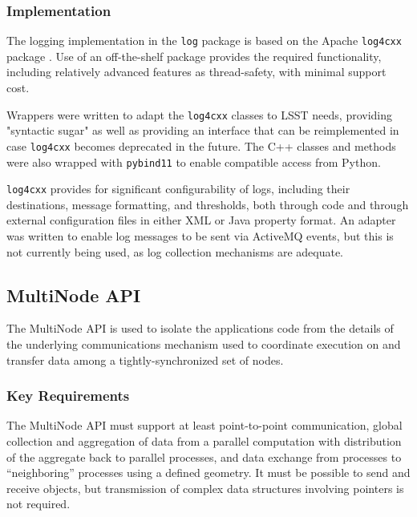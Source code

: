 \documentclass[DM,toc]{lsstdoc}
\begin{document}
\subsubsection{Implementation}\label{logging-implementation}

The logging implementation in the \texttt{log} package is based on the Apache
\texttt{log4cxx} package \citep{log4cxx}.
Use of an off-the-shelf package provides the required functionality, including
relatively advanced features as thread-safety, with minimal support cost.

Wrappers were written to adapt the \texttt{log4cxx} classes to LSST needs,
providing "syntactic sugar" as well as providing an interface that can be
reimplemented in case \texttt{log4cxx} becomes deprecated in the future.  The
C++ classes and methods were also wrapped with \texttt{pybind11} to enable
compatible access from Python.

\texttt{log4cxx} provides for significant configurability of logs, including
their destinations, message formatting, and thresholds, both through code and
through external configuration files in either XML or Java property format.
An adapter was written to enable log messages to be sent via ActiveMQ events,
but this is not currently being used, as log collection mechanisms are
adequate.


\subsection{MultiNode API}\label{multinode-api}

The MultiNode API is used to isolate the applications code from the details of
the underlying communications mechanism used to coordinate execution on and
transfer data among a tightly-synchronized set of nodes.

\subsubsection{Key Requirements}\label{multinode-reqs}

The MultiNode API must support at least point-to-point communication, global
collection and aggregation of data from a parallel computation with
distribution of the aggregate back to parallel processes, and data
exchange from processes to ``neighboring'' processes using a defined
geometry. It must be possible to send and receive objects, but
transmission of complex data structures involving pointers is not
required.
\end{document}

